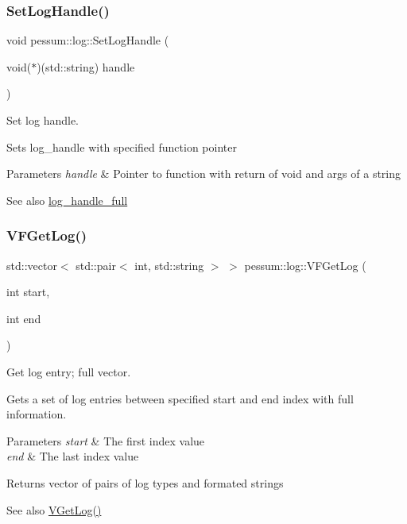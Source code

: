 \subsubsection{\texorpdfstring{Set\+Log\+Handle()}{SetLogHandle()}\hspace{0.1cm}{\footnotesize\ttfamily [2/2]}}
{\footnotesize\ttfamily void pessum\+::log\+::\+Set\+Log\+Handle (\begin{DoxyParamCaption}\item[{void($\ast$)(std\+::string)}]{handle }\end{DoxyParamCaption})}



Set log handle. 

Sets log\+\_\+handle with specified function pointer 
\begin{DoxyParams}{Parameters}
{\em handle} & Pointer to function with return of void and args of a string \\
\hline
\end{DoxyParams}
\begin{DoxySeeAlso}{See also}
\hyperlink{namespacepessum_1_1log_aa25914cc49048e5934cd41f86e74390f}{log\+\_\+handle\+\_\+full} 
\end{DoxySeeAlso}
\mbox{\label{namespacepessum_1_1log_a65630db6abcfb529e61e5df0a492ebf4}} 
\subsubsection{\texorpdfstring{V\+F\+Get\+Log()}{VFGetLog()}}
{\footnotesize\ttfamily std\+::vector$<$ std\+::pair$<$ int, std\+::string $>$ $>$ pessum\+::log\+::\+V\+F\+Get\+Log (\begin{DoxyParamCaption}\item[{int}]{start,  }\item[{int}]{end }\end{DoxyParamCaption})}



Get log entry; full vector. 

Gets a set of log entries between specified start and end index with full information. 
\begin{DoxyParams}{Parameters}
{\em start} & The first index value \\
\hline
{\em end} & The last index value \\
\hline
\end{DoxyParams}
\begin{DoxyReturn}{Returns}
vector of pairs of log types and formated strings 
\end{DoxyReturn}
\begin{DoxySeeAlso}{See also}
\hyperlink{namespacepessum_1_1log_a566d939fa6ead9aa60de41bc071ab710}{V\+Get\+Log()} 
\end{DoxySeeAlso}
\mbox{\label{namespacepessum_1_1log_a566d939fa6ead9aa60de41bc071ab710}} 
